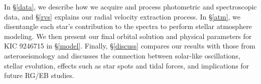 In \S \ref{data}, we describe how we acquire and process photometric and spectroscopic data, and \S \ref{rvs} explains our radial velocity extraction process. In \S \ref{atm}, we disentangle each star's contribution to the spectra to perform stellar atmosphere modeling. We then present our final orbital solution and physical parameters for KIC 9246715 in \S \ref{model}. Finally, \S \ref{discuss} compares our results with those from asteroseismology and discusses the connection between solar-like oscillations, stellar evolution, effects such as star spots and tidal forces, and implications for future RG/EB studies.
  
  
  
  
  